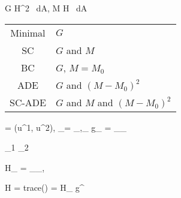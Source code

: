 \be
G \propto \int H^2 \, dA, \quad M \propto \int H \, dA
\ee

\begin{tabular}{cl}
  Minimal &  $G$ \\
  SC & $G$ and $M$ \\
  BC & $G$, $M = M_0$ \\
  ADE & $G$ and $(M - M_0)^2$ \\
  SC-ADE & $G$ and $M$ and $(M - M_0)^2$
\end{tabular}

\eframe



\be
\rr = \rr (u^1, u^2), \quad
\e_\alpha = \rr _{,_\alpha} \quad
g_{\alpha \beta} = \e_\alpha \e_\beta
\ee

\be
\n \propto \e_1 \times \e_2
\ee

\be
H_{\alpha \beta} = \e_\alpha \n_{,\beta}
\ee

\be
H = trace(\HH) = H_{\alpha \beta} g^{\alpha \beta}
\ee

\eframe

